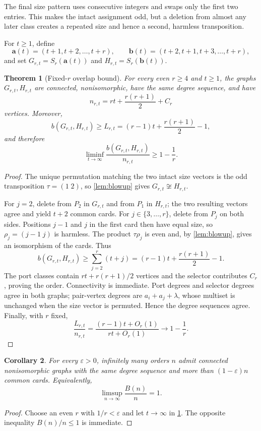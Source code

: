 \documentclass[11pt]{article}
\newtheorem{theorem}{Theorem}[section]
\newtheorem{corollary}[theorem]{Corollary}
\begin{document}
The final size pattern uses consecutive integers and swaps only the first two entries. This makes the
intact assignment odd, but a deletion from almost any later class creates a repeated size and hence a
second, harmless transposition.

For $t\ge1$, define
\[
 \mathbf a(t)=(t+1,t+2,\ldots,t+r),\qquad
 \mathbf b(t)=(t+2,t+1,t+3,\ldots,t+r),
\]
and set $G_{r,t}=S_r(\mathbf a(t))$ and $H_{r,t}=S_r(\mathbf b(t))$.

\begin{theorem}[Fixed-$r$ overlap bound]\label{thm:main}
For every even $r\ge4$ and $t\ge1$, the graphs $G_{r,t},H_{r,t}$ are connected, nonisomorphic, have the
same degree sequence, and have
\[
 n_{r,t}=rt+\frac{r(r+1)}2+C_r
\]
vertices. Moreover,
\[
 b(G_{r,t},H_{r,t})\ge L_{r,t}
   =(r-1)t+\frac{r(r+1)}2-1,
\]
and therefore
\[
 \liminf_{t\to\infty}\frac{b(G_{r,t},H_{r,t})}{n_{r,t}}\ge1-\frac1r.
\]
\end{theorem}
\begin{proof}
The unique permutation matching the two intact size vectors is the odd transposition
$\tau=(1\;2)$, so \cref{lem:blowup} gives $G_{r,t}\not\cong H_{r,t}$.

For $j=2$, delete from $P_2$ in $G_{r,t}$ and from $P_1$ in $H_{r,t}$; the two resulting vectors agree
and yield $t+2$ common cards. For $j\in\{3,\ldots,r\}$, delete from $P_j$ on both sides. Positions
$j-1$ and $j$ in the first card then have equal size, so $\rho_j=(j-1\;j)$ is harmless. The product
$\tau\rho_j$ is even and, by \cref{lem:blowup}, gives an isomorphism of the cards. Thus
\[
 b(G_{r,t},H_{r,t})\ge\sum_{j=2}^r(t+j)
 =(r-1)t+\frac{r(r+1)}2-1.
\]
The port classes contain $rt+r(r+1)/2$ vertices and the selector contributes $C_r$, proving the order.
Connectivity is immediate. Port degrees and selector degrees agree in both graphs; pair-vertex degrees
are $a_i+a_j+\lambda$, whose multiset is unchanged when the size vector is permuted. Hence the degree
sequences agree. Finally, with $r$ fixed,
\[
 \frac{L_{r,t}}{n_{r,t}}
 =\frac{(r-1)t+O_r(1)}{rt+O_r(1)}\longrightarrow1-\frac1r.
\]
\end{proof}

\begin{corollary}\label{cor:limsup}
For every $\varepsilon>0$, infinitely many orders $n$ admit connected nonisomorphic graphs with the same
degree sequence and more than $(1-\varepsilon)n$ common cards. Equivalently,
\[
 \limsup_{n\to\infty}\frac{B(n)}n=1.
\]
\end{corollary}
\begin{proof}
Choose an even $r$ with $1/r<\varepsilon$ and let $t\to\infty$ in \cref{thm:main}. The opposite
inequality $B(n)/n\le1$ is immediate.
\end{proof}
\end{document}
